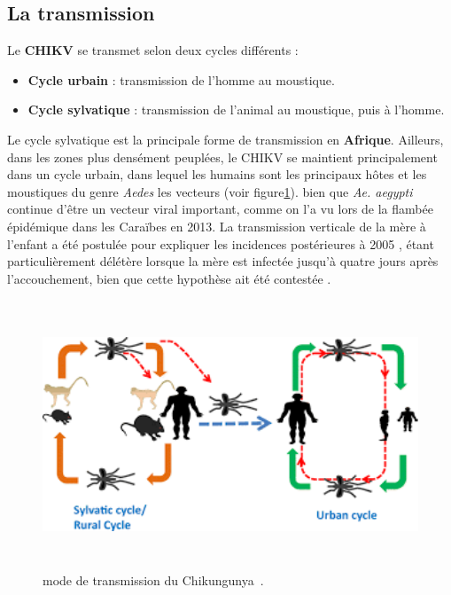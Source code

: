 \subsection{La transmission}
Le \textbf{CHIKV} se transmet selon deux cycles différents :
\begin{itemize}
	\item \textbf{Cycle urbain} : transmission de l'homme au moustique.
	\item \textbf{Cycle sylvatique} : transmission de l'animal au moustique, puis à l'homme.
\end{itemize}
Le cycle sylvatique est la principale forme de transmission en \textbf{Afrique}. Ailleurs, dans les zones plus densément peuplées, le CHIKV se maintient principalement dans un cycle urbain, dans lequel les humains sont les principaux hôtes et les moustiques du genre \textit{Aedes} les vecteurs (voir figure\ref{fig:chikvtransmission}).
bien que \textit{Ae. aegypti} continue d'être un vecteur viral important, comme on l'a vu lors de la flambée épidémique dans les Caraïbes en 2013. La transmission verticale de la mère à l'enfant a été postulée pour expliquer les incidences postérieures à 2005 , étant particulièrement délétère lorsque la mère est infectée jusqu'à quatre jours après l'accouchement, bien que cette hypothèse ait été contestée \cite{ganesan2017chikungunya}.

\begin{figure}[!h]
	\begin{center}
		\includegraphics[height=8cm]{images/trans}
	\end{center}
	\caption{mode de transmission du Chikungunya~\cite{infographicCHIKV}.}
	\label{fig:chikvtransmission}
\end{figure}
